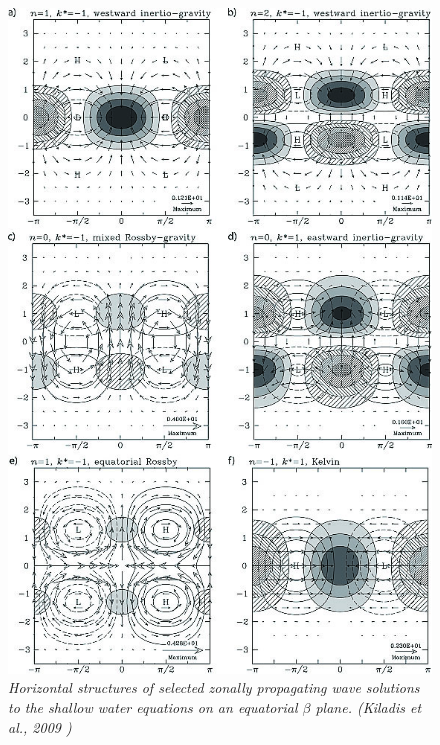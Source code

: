 \begin{figure}[ht!]
    \centering
    \includegraphics[height=0.75\textheight]{graphics/rog1687-fig-0003.jpg}
    \caption{\textit{Horizontal structures of selected zonally propagating wave solutions to the shallow water equations on an equatorial $\beta$ plane. (Kiladis et al., 2009 \cite{https://doi.org/10.1029/2008RG000266})}}
\end{figure}

